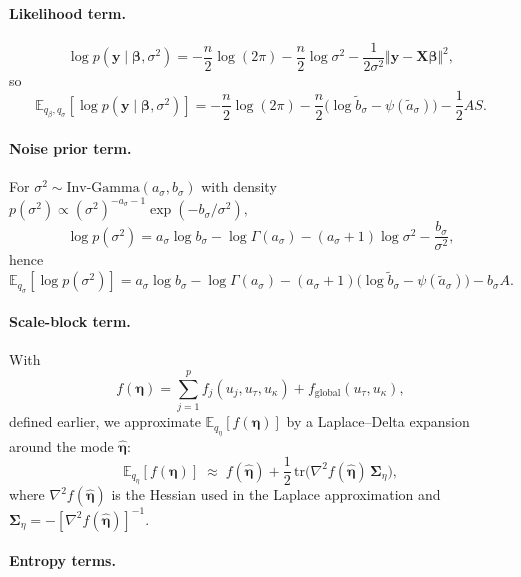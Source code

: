 \documentclass[11pt]{article}
\newcommand{\vect}[1]{\boldsymbol{#1}}
\newcommand{\mat}[1]{\mathbf{#1}}
\newcommand{\E}{\mathbb{E}}
\newcommand{\IG}{\mathrm{Inv\text{-}Gamma}}
\begin{document}
\paragraph{Likelihood term.}
\[
  \log p(\vect{y}\mid\vect{\beta},\sigma^2)
  = -\frac{n}{2}\log(2\pi)
    -\frac{n}{2}\log\sigma^2
    -\frac{1}{2\sigma^2}\Vert \vect{y}-\mat{X}\vect{\beta}\Vert^2,
\]
so
\begin{equation}
  \E_{q_\beta,q_\sigma}[\log p(\vect{y}\mid\vect{\beta},\sigma^2)]
  = -\frac{n}{2}\log(2\pi)
    -\frac{n}{2}\big(\log \tilde b_\sigma - \psi(\tilde a_\sigma)\big)
    -\frac{1}{2} A S.
\end{equation}

\paragraph{Noise prior term.}
For $\sigma^2 \sim \IG(a_\sigma,b_\sigma)$ with density
\(
  p(\sigma^2) \propto (\sigma^2)^{-a_\sigma-1}\exp(-b_\sigma/\sigma^2),
\)
\[
  \log p(\sigma^2)
  = a_\sigma \log b_\sigma - \log\Gamma(a_\sigma)
    - (a_\sigma+1)\log\sigma^2
    - \frac{b_\sigma}{\sigma^2},
\]
hence
\begin{equation}
  \E_{q_\sigma}[\log p(\sigma^2)]
  = a_\sigma \log b_\sigma - \log\Gamma(a_\sigma)
    - (a_\sigma+1)\big(\log \tilde b_\sigma - \psi(\tilde a_\sigma)\big)
    - b_\sigma A.
\end{equation}

\paragraph{Scale-block term.}
With
\[
  f(\vect{\eta})
  = \sum_{j=1}^p f_j(u_j,u_\tau,u_\kappa)
    + f_{\mathrm{global}}(u_\tau,u_\kappa),
\]
defined earlier, we approximate $\E_{q_\eta}[f(\vect{\eta})]$ by a Laplace--Delta expansion around the mode $\hat{\vect{\eta}}$:
\begin{equation}
  \E_{q_\eta}[f(\vect{\eta})]
  \;\approx\;
  f(\hat{\vect{\eta}})
  + \frac12\,\mathrm{tr}\!\big(\nabla^2 f(\hat{\vect{\eta}})\,\mat{\Sigma}_\eta\big),
\end{equation}
where $\nabla^2 f(\hat{\vect{\eta}})$ is the Hessian used in the Laplace approximation and $\mat{\Sigma}_\eta = -[\nabla^2 f(\hat{\vect{\eta}})]^{-1}$.

\paragraph{Entropy terms.}
\end{document}
